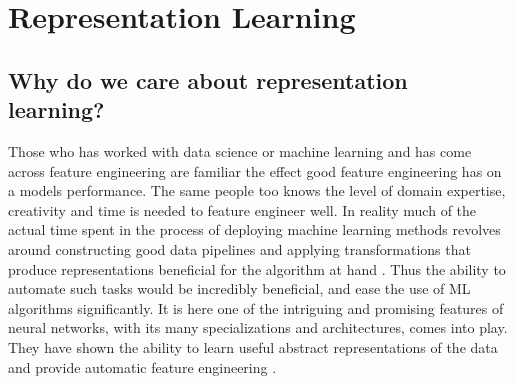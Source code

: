 \documentclass[../../thesis.tex]{subfiles}
\begin{document}







\section{Representation Learning}

\cite{Rep-rev-persp}

\subsection{Why do we care about representation learning?}
Those who has worked with data science or machine learning and has come across feature engineering are familiar the effect good feature engineering has on a models performance. The same people too knows the level of domain expertise, creativity and time is needed to feature engineer well. In reality much of the actual time spent in the process of deploying machine learning methods revolves around constructing good data pipelines and applying transformations that produce representations beneficial for the algorithm at hand \cite{Rep-rev-persp}. Thus the ability to automate such tasks would be incredibly beneficial, and ease the use of ML algorithms significantly. It is here one of the intriguing and promising features of neural networks, with its many specializations and architectures, comes into play. They have shown the ability to learn useful abstract representations of the data and provide automatic feature engineering \cite{Rep-rev-persp}. 
\end{document}
